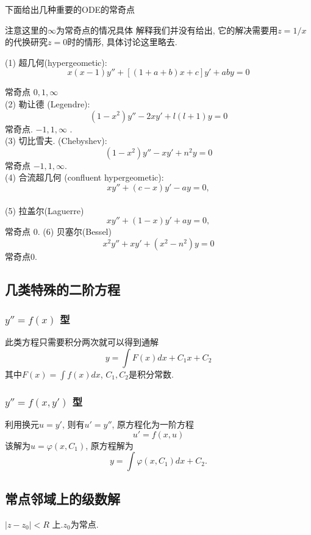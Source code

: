 下面给出几种重要的ODE的常奇点
\begin{note}
    注意这里的$\infty$为常奇点的情况具体
    解释我们并没有给出, 它的解决需要用$z=1/x$的代换研究$z=0$时的情形, 具体讨论这里略去.
\end{note}
(1) 超几何(hypergeometic):
$$
x(x-1) y''+[(1+a+b) x+c] y'+a b y= 0
$$

常奇点 $0,1, \infty$\\
(2) 勒让德 (Legendre):
$$
\left(1-x^2\right) y''-2 x y'+l(l+1) y=0
$$
常奇点. $-1,1, \infty$ .\\
(3) 切比雪夫. (Chebyshev):
$$
\left(1-x^2\right) y''-x y'+n^2 y=0 
$$
常奇点 $-1,1, \infty$.\\

(4) 合流超几何 (confluent hypergeometic):
$$
x y''+(c-x) y'-a y=0,
$$
\\
(5) 拉盖尔(Laguerre)
$$
x y''+(1-x) y'+a y=0,
$$
常奇点 $0$.
(6) 贝塞尔(Bessel)
$$
x^2 y'' + xy' + (x^2 - n^2) y = 0
$$
常奇点$0$.

\subsection{几类特殊的二阶方程}
\subsubsection{ $y'' = f(x)$ 型}
此类方程只需要积分两次就可以得到通解
\begin{equation}
    y = \int F(x) dx + C_1 x + C_2
\end{equation}
其中$F(x) = \int f(x) dx$, $C_1, C_2$是积分常数.
\subsubsection{ $y'' = f(x, y')$ 型}
利用换元$u = y'$, 则有$u' = y''$, 原方程化为一阶方程
$$ u' = f(x,u)$$
该解为$u = \varphi(x, C_1)$, 原方程解为
\begin{equation}
    y = \int \varphi(x, C_1) dx  + C_2.
\end{equation}


\subsection{常点邻域上的级数解}
$\left|z-z_0\right|<R$ 上.$z_0$为常点.


